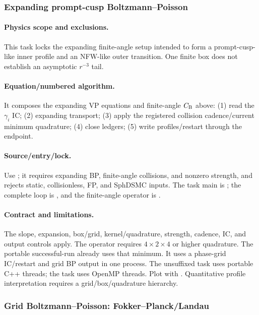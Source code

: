 \subsubsection{Expanding prompt-cusp Boltzmann--Poisson}
\paragraph{Physics scope and exclusions.}
This task locks the expanding finite-angle setup intended to form a
prompt-cusp-like inner profile and an NFW-like outer transition.  One finite
box does not establish an asymptotic \(r^{-3}\) tail.
\paragraph{Equation/numbered algorithm.}
It composes the expanding VP equations and finite-angle \(C_{\rm B}\) above:
(1) read the \(\gamma_i\) IC; (2) expanding transport; (3) apply the registered
collision cadence/current minimum quadrature; (4) close ledgers; (5) write
profiles/restart through the endpoint.
\paragraph{Source/entry/lock.}
Use ; it requires
expanding BP, finite-angle collisions, and nonzero strength, and rejects
static, collisionless, FP, and SphDSMC inputs.
The task main is
; the complete
loop is , and the finite-angle operator is
.
\paragraph{Contract and limitations.}
The slope, expansion, box/grid, kernel/quadrature, strength, cadence, IC, and
output controls apply.  The operator requires \(4\times2\times4\) or higher
quadrature.  The portable successful-run  already uses that
minimum.  It uses a phase-grid IC/restart and grid BP output in one process.
The unsuffixed task uses portable C++ threads; the  task uses
OpenMP threads.  Plot with .
Quantitative profile interpretation requires a grid/box/quadrature hierarchy.

\subsubsection{Grid Boltzmann--Poisson: Fokker--Planck/Landau}
